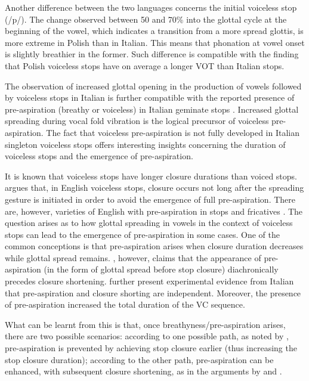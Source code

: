 \documentclass[
  11pt,
  a4paper,
]{article}
\begin{document}
Another difference between the two languages concerns the initial
voiceless stop (/p/). The change observed between 50 and 70\% into the
glottal cycle at the beginning of the vowel, which indicates a
transition from a more spread glottis, is more extreme in Polish than in
Italian. This means that phonation at vowel onset is slightly breathier
in the former. Such difference is compatible with the finding that
Polish voiceless stops have on average a longer VOT than Italian stops.

The observation of increased glottal opening in the production of vowels
followed by voiceless stops in Italian is further compatible with the
reported presence of pre-aspiration (breathy or voiceless) in Italian
geminate stops
\citep{stevens2004, stevens2004a, stevens2010, stevens2010b, stevens2014a}.
Increased glottal spreading during vocal fold vibration is the logical
precursor of voiceless pre-aspiration. The fact that voiceless
pre-aspiration is not fully developed in Italian singleton voiceless
stops offers interesting insights concerning the duration of voiceless
stops and the emergence of pre-aspiration.

It is known that voiceless stops have longer closure durations than
voiced stops. \citet{lisker1974} argues that, in English voiceless
stops, closure occurs not long after the spreading gesture is initiated
in order to avoid the emergence of full pre-aspiration. There are,
however, varieties of English with pre-aspiration in stops and
fricatives \citep{gordeeva2007, nance2013, hejna2015a}. The question
arises as to how glottal spreading in vowels in the context of voiceless
stops can lead to the emergence of pre-aspiration in some cases. One of
the common conceptions is that pre-aspiration arises when closure
duration decreases while glottal spread remains. \citet{nichasaide1985},
however, claims that the appearance of pre-aspiration (in the form of
glottal spread before stop closure) diachronically precedes closure
shortening. \citet{stevens2014} further present experimental evidence
from Italian that pre-aspiration and closure shorting are independent.
Moreover, the presence of pre-aspiration increased the total duration of
the VC sequence.

What can be learnt from this is that, once breathyness/pre-aspiration
arises, there are two possible scenarios: according to one possible
path, as noted by \citet{lisker1974}, pre-aspiration is prevented by
achieving stop closure earlier (thus increasing the stop closure
duration); according to the other path, pre-aspiration can be enhanced,
with subsequent closure shortening, as in the arguments by
\citet{nichasaide1985} and \citet{stevens2014}.

  
\end{document}
